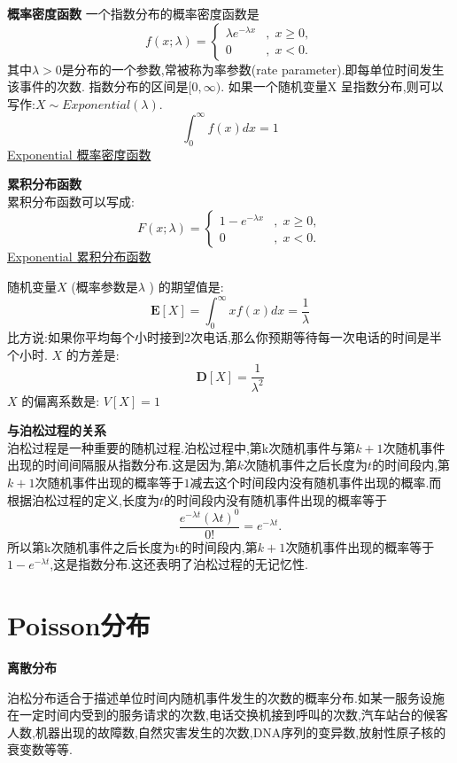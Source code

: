 \documentclass{article}
\begin{document}
\textbf{概率密度函数}
一个指数分布的概率密度函数是
$$f(x;\lambda )=\left\{{\begin{matrix}\lambda e^{{-\lambda x}}&,\;x\geq 0,\\0&,\;x<0.\end{matrix}}\right.$$
其中$\lambda  > 0$是分布的一个参数,常被称为率参数(rate parameter).即每单位时间发生该事件的次数.
指数分布的区间是$[0,\infty)$. 如果一个随机变量X 呈指数分布,则可以写作:$X \sim Exponential(\lambda )$.
$$
\int_0^{\infty} f(x)dx = 1
$$
\href{http://upload.wikimedia.org/wikipedia/commons/thumb/b/b1/Exponential\_distribution\_pdf.png/800px-Exponential\_distribution\_pdf.png}{Exponential 概率密度函数}
	
\textbf{累积分布函数}\\
累积分布函数可以写成:
$$F(x;\lambda )=\left\{{\begin{matrix}1-e^{{-\lambda x}}&,\;x\geq 0,\\0&,\;x<0.\end{matrix}}\right.$$
\href{http://upload.wikimedia.org/wikipedia/commons/thumb/b/b1/Exponential\_distribution\_pdf.png/800px-Exponential\_distribution\_pdf.png}{Exponential 累积分布函数}
	
随机变量$X$ (概率参数是$\lambda$ ) 的期望值是:
$$
{\mathbf  {E}}[X]=\int_0^{\infty} xf(x)dx = {\frac  {1}{\lambda }}
$$
比方说:如果你平均每个小时接到2次电话,那么你预期等待每一次电话的时间是半个小时.
$X$ 的方差是:
$${\mathbf  {D}}[X]={\frac{1}{\lambda ^{2}}}
$$
$X$ 的偏离系数是: $V[X] = 1$

\textbf{与泊松过程的关系}\\
泊松过程是一种重要的随机过程.泊松过程中,第k次随机事件与第$k+1$次随机事件出现的时间间隔服从指数分布.这是因为,第$k$次随机事件之后长度为$t$的时间段内,第$k+1$次随机事件出现的概率等于$1$减去这个时间段内没有随机事件出现的概率.而根据泊松过程的定义,长度为$t$的时间段内没有随机事件出现的概率等于
$$
{\frac  {e^{{-\lambda t}}(\lambda t)^{0}}{0!}}=e^{{-\lambda t}}.
$$
所以第k次随机事件之后长度为t的时间段内,第$k+1$次随机事件出现的概率等于$1-e^{{-\lambda t}}$,这是指数分布.这还表明了泊松过程的无记忆性.

\section{Poisson分布}
\label{sec.distribution.poisson}
\textbf{离散分布}

泊松分布适合于描述单位时间内随机事件发生的次数的概率分布.如某一服务设施在一定时间内受到的服务请求的次数,电话交换机接到呼叫的次数,汽车站台的候客人数,机器出现的故障数,自然灾害发生的次数,DNA序列的变异数,放射性原子核的衰变数等等.
\end{document}
